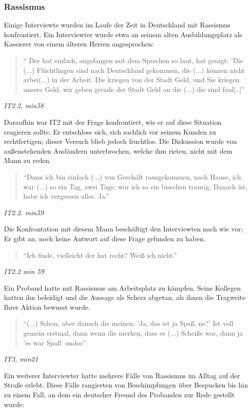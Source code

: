 \subsubsection{Rassismus}

Einige Interviewte wurden im Laufe der Zeit in Deutschland mit Rassismus konfrontiert. Ein Interviewter wurde etwa an seinem alten Ausbildungsplatz als Kassierer von einem älteren Herren angesprochen:
\begin{quote}
    `` Der hat einfach, angefangen mit dem Sprechen so laut, hat gesagt: 'Die (...) Flüchtlingen sind nach Deutschland gekommen, die (...) können nicht arbei(...) in der Arbeit. Die kriegen von der Stadt Geld, und Sie kriegen unsere Geld, wir geben gerade der Stadt Geld an die (...) die sind faul[..]'' 
\end{quote}
\centerline{\textit{IT2.2, min58}}
Daraufhin war IT2 mit der Frage konfrontiert, wie er auf diese Situation reagieren sollte. Er entschloss sich, sich sachlich vor seinem Kunden zu rechtfertigen; dieser Versuch blieb jedoch fruchtlos. Die Diskussion wurde von außenstehenden Ausländern unterbrochen, welche ihm rieten, nicht mit dem Mann zu reden.
\begin{quote}
    ``Dann ich bin einfach (...) von Geschäft rausgekommen, nach Hause, ich war (...) so ein Tag, zwei Tage, war ich so ein bisschen traurig. Danach ist, habe ich vergessen alles. Ja.''
\end{quote}
\centerline{\textit{IT2.2. min59}}
Die Konfrontation mit diesem Mann beschäftigt den Interviewten nach wie vor; Er gibt an, noch keine Antwort auf diese Frage gefunden zu haben.
\begin{quote}
    ``Ich finde, vielleicht der hat recht? Weiß ich nicht.''
\end{quote}
\centerline{\textit{IT2.2 min 59}}
Ein Proband hatte mit Rassismus am Arbeitsplatz zu kämpfen. Seine Kollegen hatten ihn beleidigt und die Aussage als Scherz abgetan, als ihnen die Tragweite Ihrer Aktion bewusst wurde.\newline
\begin{quote}
    ``(...) Schon, aber danach die meinen: 'Ja, das ist ja Spaß, ne?' Ist voll gemein erstmal, dann wenn die merken, dass es (...) Scheiße war, dann ja 'es war Spaß' undso''
\end{quote}
\centerline{\textit{IT3, min21}}
Ein weiterer Interviewter hatte mehrere Fälle von Rassismus im Alltag auf der Straße erlebt. Diese Fälle rangierten von Beschimpfungen über Bespucken bis hin zu einem Fall, an dem ein deutscher Freund des Probanden zur Rede gestellt wurde:
